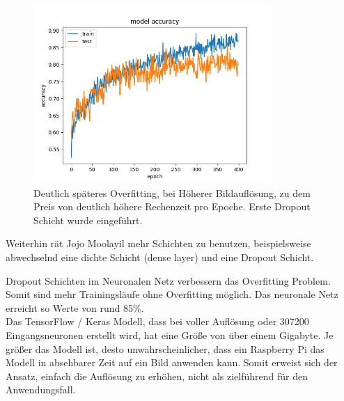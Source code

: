\documentclass[conference]{IEEEtran}
\begin{document}
	\begin{figure}[!h]
	\centering
	\includegraphics[width=9cm]{img/213x160:400@32_accuracy.png}
	\caption{Deutlich späteres Overfitting, bei Höherer Bildauflösung, zu dem 
	Preis von deutlich höhere Rechenzeit pro Epoche. Erste Dropout Schicht 
	wurde eingeführt. }
	\label{Overfitt }
\end{figure}
	Weiterhin rät Jojo Moolayil \cite{moolayil2019learn} mehr Schichten zu benutzen, 
	beispielsweise abwechselnd eine dichte Schicht (dense layer) und eine 
	Dropout Schicht.
	
	Dropout Schichten im Neuronalen Netz verbessern das Overfitting 
	Problem. Somit sind mehr Trainingsläufe ohne Overfitting möglich. Das 
	neuronale Netz erreicht so Werte von rund 85\%. \\
	
	Das TensorFlow / Keras Modell, dass bei voller Auflösung oder 307200 
	Eingangsneuronen erstellt wird, hat eine Größe von über einem 
	Gigabyte. Je größer das Modell ist, desto unwahrscheinlicher, dass ein 
	Raspberry Pi das Modell in absehbarer Zeit auf ein Bild anwenden kann. 
	Somit erweist sich der Ansatz, einfach die Auflösung zu erhöhen, nicht als 
	zielführend für den Anwendungsfall. \\
	
\end{document}
